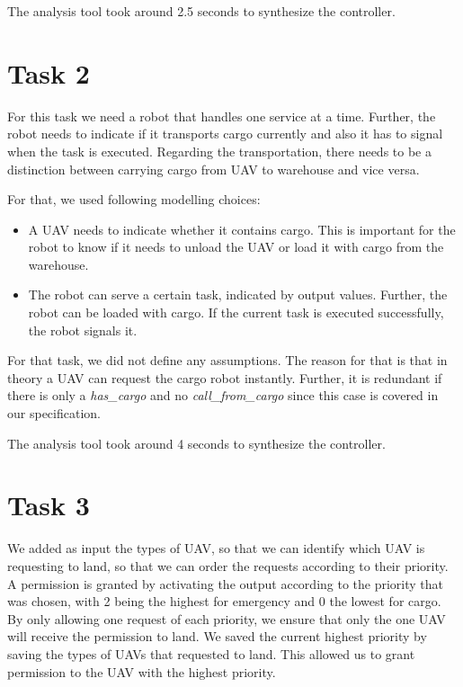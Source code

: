 \documentclass[	runningheads,
				a4paper]{llncs}
\begin{document}

The analysis tool took around 2.5 seconds to synthesize the controller.



\section{Task 2}

For this task we need a robot that handles one service at a time. Further, the robot needs to indicate if it transports cargo currently and also it has to signal when the task is executed. Regarding the transportation, there needs to be a distinction between carrying cargo from UAV to warehouse and vice versa.

For that, we used following modelling choices:

\begin{itemize}
	\item A UAV needs to indicate whether it contains cargo. This is important for the robot to know if it needs to unload the UAV or load it with cargo from the warehouse.
    \item The robot can serve a certain task, indicated by output values. Further, the robot can be loaded with cargo. If the current task is executed successfully, the robot signals it.
\end{itemize}

For that task, we did not define any assumptions. The reason for that is that in theory a UAV can request the cargo robot instantly. Further, it is redundant if there is only a \textit{has\_cargo} and no \textit{call\_from\_cargo} since this case is covered in our specification. 




The analysis tool took around 4 seconds to synthesize the controller.



\section{Task 3}

We added as input the types of UAV, so that we can identify which UAV is requesting to land, so that we can order the requests according to their priority. A permission is granted by activating the output according to the priority that was chosen, with 2 being the highest for emergency and 0 the lowest for cargo. By only allowing one request of each priority, we ensure that only the one UAV will receive the permission to land.
We saved the current highest priority by saving the types of UAVs that requested to land. This allowed us to grant permission to the UAV with the highest priority.
\end{document}

